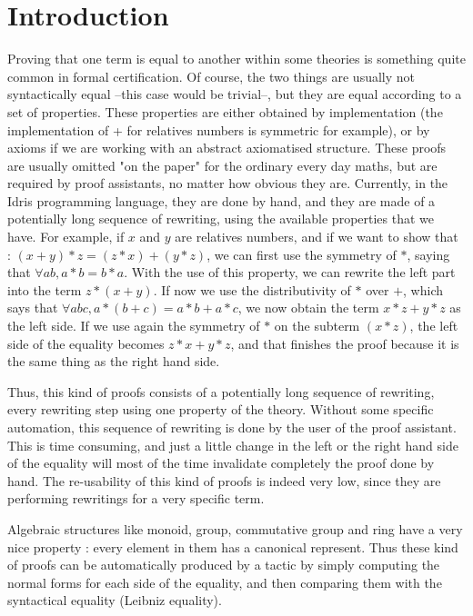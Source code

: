 \section{Introduction}


Proving that one term is equal to another within some theories is something quite common in formal certification. Of course, the two things are usually not syntactically equal --this case would be trivial--, but they are equal according to a set of properties. These properties are either obtained by implementation (the implementation of + for relatives numbers is symmetric for example), or by axioms if we are working with an abstract axiomatised structure. 
These proofs are usually omitted "on the paper" for the ordinary every day maths, but are required by proof assistants, no matter how obvious they are. Currently, in the Idris programming language, they are done by hand, and they are made of a potentially long sequence of rewriting, using the available properties that we have. For example, if $x$ and $y$ are relatives numbers, and if we want to show that :
$(x + y) * z = (z * x) + (y * z)$, we can first use the symmetry of $*$, saying that
$\forall a b, a * b = b * a$.
With the use of this property, we can rewrite the left part into the term $z * (x + y)$.
If now we use the distributivity of $*$ over $+$, which says that
$\forall a b c, a * (b+c) = a*b + a*c$,
we now obtain the term $x*z + y*z$ as the left side.
If we use again the symmetry of $*$ on the subterm $(x*z)$, the left side of the equality becomes $z*x + y*z$, and that finishes the proof because it is the same thing as the right hand side.

Thus, this kind of proofs consists of a potentially long sequence of rewriting, every rewriting step using one property of the theory. Without some specific automation, this sequence of rewriting is done by the user of the proof assistant. This is time consuming, and just a little change in the left or the right hand side of the equality will most of the time invalidate completely the proof done by hand. The re-usability of this kind of proofs is indeed very low, since they are performing rewritings for a very specific term.

Algebraic structures like monoid, group, commutative group and ring have a very nice property : every element in them has a canonical represent. Thus these kind of proofs can be automatically produced by a tactic by simply computing the normal forms for each side of the equality, and then comparing them with the syntactical equality (Leibniz equality).

